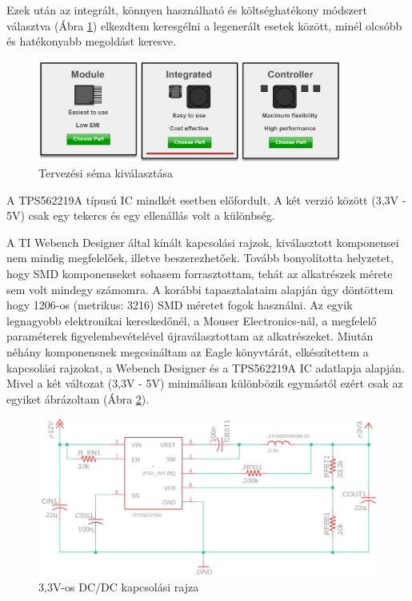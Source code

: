 \documentclass[../main.tex]{subfiles}
\begin{document}
            Ezek után az integrált, könnyen használható és költséghatékony módszert választva (Ábra \ref{fig:ti_we_des_int_etu_ce_method}) elkezdtem keresgélni a legenerált esetek között, minél olcsóbb és hatékonyabb megoldást keresve.
            
            \begin{figure}[h!]
                \centering
                    \includegraphics[width=10cm]{resources/pcb_res/ti_we_des_int_etu_ce_method_2.png}
                \caption{Tervezési séma kiválasztása}
                \label{fig:ti_we_des_int_etu_ce_method}
            \end{figure}
            
            A TPS562219A típusú IC mindkét esetben előfordult. A két verzió között (3,3V - 5V) csak egy tekercs és egy ellenállás volt a különbség.
            
            A TI Webench Designer által kínált kapcsolási rajzok, kiválasztott komponensei nem mindig megfelelőek, illetve beszerezhetőek. Tovább bonyolította helyzetet, hogy SMD komponenseket sohasem forrasztottam, tehát az alkatrészek mérete sem volt mindegy számomra. A korábbi tapasztalataim alapján úgy döntöttem hogy 1206-os (metrikus: 3216) SMD méretet fogok használni. Az egyik legnagyobb elektronikai kereskedőnél, a Mouser Electronics-nál, a megfelelő paraméterek figyelembevételével újraválasztottam az alkatrészeket. Miután néhány komponensnek megcsináltam az Eagle könyvtárát, elkészítettem a kapcsolási rajzokat, a Webench Designer és a TPS562219A IC adatlapja alapján. Mivel a két változat (3,3V - 5V) minimálisan különbözik egymástól ezért csak az egyiket ábrázoltam (Ábra \ref{fig:schematic_3v3}).
            
            \begin{figure}[h!]
                \centering
                    \includegraphics[width=12cm]{resources/pcb_res/schematic_3v3.png}
                \caption{3,3V-os DC/DC kapcsolási rajza}
                \label{fig:schematic_3v3}
            \end{figure}
            
\end{document}
